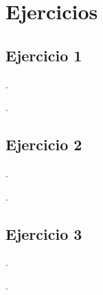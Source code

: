 
\section*{Ejercicios}



\begin{Enunciado}
	\subsection*{Ejercicio 1}

	\lipsum[1].
\end{Enunciado}

\vspace*{1em}

\lipsum[1].

\vspace*{2em}


\begin{Enunciado}
	\subsection*{Ejercicio 2}
    
	\lipsum[1].
\end{Enunciado}

\vspace*{1em}

\lipsum[1].

\vspace*{2em}


\begin{Enunciado}
	\subsection*{Ejercicio 3}
    
	\lipsum[1].
\end{Enunciado}

\vspace*{1em}

\lipsum[1].

